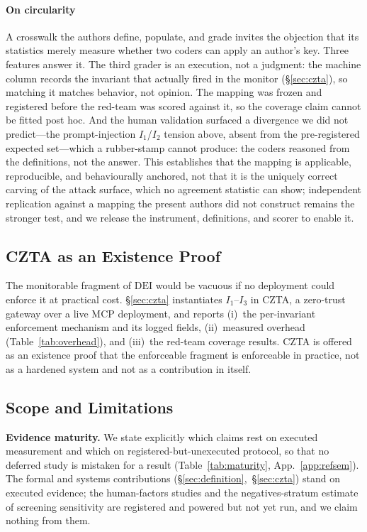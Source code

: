 \documentclass[conference]{IEEEtran}
\newcommand{\Ione}{\ensuremath{I_1}}
\newcommand{\Itwo}{\ensuremath{I_2}}
\newcommand{\Ithree}{\ensuremath{I_3}}
\newcommand{\DEI}{\ensuremath{\mathrm{DEI}}}
\begin{document}
\paragraph*{On circularity}
A crosswalk the authors define, populate, and grade invites the
objection that its statistics merely measure whether two coders
can apply an author's key. Three features answer it. The third
grader is an execution, not a judgment: the machine column records
the invariant that actually fired in the monitor
(\S\ref{sec:czta}), so matching it matches behavior, not opinion.
The mapping was frozen and registered before the red-team was
scored against it, so the coverage claim cannot be fitted post
hoc. And the human validation surfaced a divergence we did not
predict---the prompt-injection \Ione/\Itwo{} tension above, absent
from the pre-registered expected set---which a rubber-stamp cannot
produce: the coders reasoned from the definitions, not the answer.
This establishes that the mapping is applicable, reproducible, and
behaviourally anchored, not that it is the uniquely correct carving
of the attack surface, which no agreement statistic can show;
independent replication against a mapping the present authors did
not construct remains the stronger test, and we release the
instrument, definitions, and scorer to enable it.


\subsection{CZTA as an Existence Proof}
The monitorable fragment of \DEI{} would be vacuous if no
deployment could enforce it at practical cost. \S\ref{sec:czta}
instantiates \Ione--\Ithree{} in CZTA, a zero-trust gateway over a
live MCP deployment, and reports (i)~the per-invariant enforcement
mechanism and its logged fields, (ii)~measured overhead
(Table~\ref{tab:overhead}), and (iii)~the red-team coverage
results. CZTA is offered as an existence proof that the
enforceable fragment is enforceable in practice, not as a
hardened system and not as a contribution in itself.

\subsection{Scope and Limitations}
\label{sec:limitations}

\noindent\textbf{Evidence maturity.} We state explicitly which claims
rest on executed measurement and which on registered-but-unexecuted
protocol, so that no deferred study is mistaken for a result
(Table~\ref{tab:maturity}, App.~\ref{app:refsem}). The formal and systems contributions
(\S\ref{sec:definition},~\S\ref{sec:czta}) stand on executed evidence; the
human-factors studies and the negatives-stratum estimate of screening
sensitivity are registered and powered but not yet run, and we claim
nothing from them.
\end{document}
